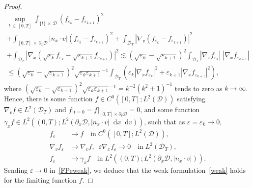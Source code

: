 \documentclass[10pt]{amsart}
\theoremstyle{definition}\newtheorem{defi}[theo]{Definition}\newtheorem{rema}[theo]{Remark}\newtheorem{exam}[theo]{Example}\newtheorem{exem}[theo]{Example}\newtheorem{nota}[theo]{Notation}
\newcommand*{\dif}{\mathop{}\!\mathrm{d}}
\newcommand*\p{\partial}
\newcommand*\D {\mathcal{D}}
\begin{document}
\begin{proof}
\begin{multline*}
\sup_{t\,\in\,[0,T]} \int_{\{t\}\,\times\,\D} \left(f_{\varepsilon_{k}}-f_{\varepsilon_{k+1}}\right)^2 \\
+ \int_{[0,T]\,\times\,\p_x\D} |n_x\cdot v| \left(f_{\varepsilon_{k}}-f_{\varepsilon_{k+1}}\right)^2 + \int_{\D_T}\left|\nabla_v\left(f_{\varepsilon_{k}}-f_{\varepsilon_{k+1}}\right)\right|^2 \\
+ \int_{\D_T}\left|\nabla_x\left(\sqrt{\varepsilon_{k}}f_{\varepsilon_{k}}-\sqrt{\varepsilon_{k+1}}f_{\varepsilon_{k+1}}\right)\right|^2
\lesssim \left(\sqrt{\varepsilon_{k}}-\sqrt{\varepsilon_{k+1}}\right)^2
\int_{\D_T}|\nabla_xf_{\varepsilon_{k}}|\;\left|\nabla_xf_{\varepsilon_{k+1}}\right|\\
\le \left(\sqrt{\varepsilon_{k}}-\sqrt{\varepsilon_{k+1}}\right)^2\sqrt{\varepsilon_{k}\varepsilon_{k+1}}^{-1}
\int_{\D_T}\left(\varepsilon_{k}\left|\nabla_xf_{\varepsilon_{k}}\right|^2+\varepsilon_{k+1}\left|\nabla_xf_{\varepsilon_{k+1}}\right|^2\right),
\end{multline*}
where $(\sqrt{\varepsilon_{k}}-\sqrt{\varepsilon_{k+1}})^2\sqrt{\varepsilon_{k}\varepsilon_{k+1}}^{-1}=k^{-2}(k^2+1)^{-1}$ tends to zero as $k\rightarrow\infty$. Hence, there is some function $f\in C^0([0,T];L^2(\D))$ satisfying $\nabla_vf\in L^2\left(\D_T\right)$ and $f|_{t=0}=f|_{[0,T]\times\p_v\D}=0$, and some function $\gamma_xf\in L^2((0,T);L^2(\p_x\D,|n_x\cdot v|\dif x\dif v))$, such that as $\varepsilon=\varepsilon_k\rightarrow0$,
\begin{equation}\label{felimit}
\begin{split}
f_\varepsilon &\rightarrow f \quad\text{in}\; C^0\left([0,T];L^2(\D)\right),\\
\nabla_vf_\varepsilon &\rightarrow \nabla_vf, \ \; \varepsilon\nabla_xf_\varepsilon\rightarrow 0 \quad\text{in}\; L^2(\D_T),  \\
f_\varepsilon &\rightarrow \gamma_xf\quad\text{in}\; L^2\left((0,T);L^2\left(\p_x\D,|n_x\cdot v|\right)\right).
\end{split}
\end{equation}
Sending $\varepsilon\rightarrow0$ in~\eqref{FPeweak}, we deduce that the weak formulation~\eqref{weak} holds for the limiting function $f$.


\end{proof}
\end{document}
